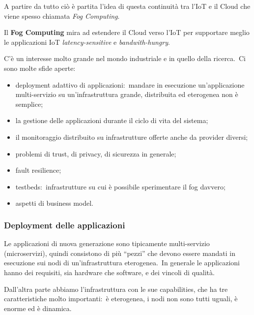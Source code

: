 \noindent A partire da tutto ciò è partita l'idea di questa continuità tra l'IoT e il Cloud che viene spesso chiamata \textit{Fog Computing}.

\vspace{12pt}
\noindent Il \textbf{Fog Computing} mira ad estendere il Cloud verso l'IoT per supportare meglio le applicazioni IoT \textit{latency-sensitive} e \textit{bandwith-hungry}.
\vspace{12pt}

\noindent C'è un interesse molto grande nel mondo industriale e in quello della ricerca.\
Ci sono molte sfide aperte:
\begin{itemize}
	\item deployment adattivo di applicazioni:\ mandare in esecuzione un'applicazione multi-servizio su un'infrastruttura grande, distribuita ed eterogenea non è semplice;
	\item la gestione delle applicazioni durante il ciclo di vita del sistema;
	\item il monitoraggio distribuito su infrastrutture offerte anche da provider diversi;
	\item problemi di trust, di privacy, di sicurezza in generale;
	\item fault resilience;
	\item testbeds:\ infrastrutture su cui è possibile sperimentare il fog davvero;
	\item aspetti di business model.
\end{itemize}

\subsubsection{Deployment delle applicazioni}

Le applicazioni di nuova generazione sono tipicamente multi-servizio (microservizi), quindi consistono di più ``pezzi'' che devono essere mandati in esecuzione sui nodi di un'infrastruttura eterogenea.\
In generale le applicazioni hanno dei requisiti, sia hardware che software, e dei vincoli di qualità.

Dall'altra parte abbiamo l'infrastruttura con le sue capabilities, che ha tre caratteristiche molto importanti:\ è eterogenea, i nodi non sono tutti uguali, è enorme ed è dinamica.

